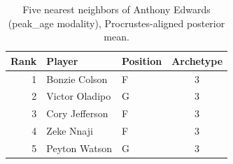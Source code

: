 \begin{table}[htbp]
  \centering\small
  \begin{tabular}{rllc}
    \toprule
    Rank & Player & Position & Archetype \\
    \midrule
    1 & Bonzie Colson & F & 3 \\
    2 & Victor Oladipo & G & 3 \\
    3 & Cory Jefferson & F & 3 \\
    4 & Zeke Nnaji & F & 3 \\
    5 & Peyton Watson & G & 3 \\
    \bottomrule
  \end{tabular}
  \caption{Five nearest neighbors of Anthony Edwards (peak_age modality), Procrustes-aligned posterior mean.}
  \label{tab:Anthony_Edwards_neighbors_peak_age}
\end{table}

